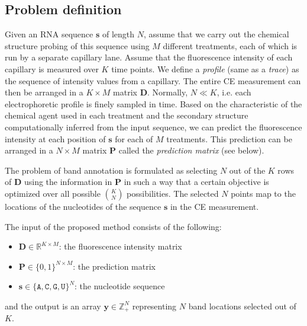 \newcommand{\bA}{{\mathbf{D}}}
\newcommand{\bB}{{\mathbf{B}}}
\newcommand{\bC}{{\mathbf{P}}}
\newcommand{\bP}{{\mathbf{P}}}
\newcommand{\bF}{{\mathbf{F}}}
\newcommand{\bL}{{\mathbf{L}}}
\newcommand{\ba}{{\mathbf{d}}}
\newcommand{\bp}{{\mathbf{p}}}
\newcommand{\bs}{{\mathbf{s}}}
\newcommand{\by}{{\mathbf{y}}}

\subsection{Problem definition}
Given an RNA sequence $\bs$ of length $N$, assume that we carry out the chemical structure probing of this sequence using $M$ different treatments, each of which is run by a separate capillary lane. Assume that the fluorescence intensity of each capillary is measured over $K$ time points. We define a \emph{profile} (same as a \emph{trace}) as the sequence of intensity values from a capillary. The entire CE measurement can then be arranged in a $K \times M$ matrix $\bA$. Normally, $N \ll K$, i.e. each electrophoretic profile is finely sampled in time. Based on the characteristic of the chemical agent used in each treatment and the secondary structure computationally inferred from the input sequence, we can predict the fluorescence intensity at each position of $\bs$ for each of $M$ treatments. This prediction can be arranged in a $N \times M$ matrix $\bC$ called the \emph{prediction matrix} (see below).

The problem of band annotation is formulated as selecting $N$ out of the $K$ rows of $\bA$ using the information in $\bC$ in such a way that a certain objective is optimized over all possible ${K \choose N}$ possibilities. The selected $N$ points map to the locations of the nucleotides of the sequence $\bs$ in the CE measurement.

The input of the proposed method consists of the following:
\begin{itemize}
\item $\bA \in \mathbb{R}^{K \times M}$: the fluorescence intensity matrix
\item $\bC \in \{0,1\}^{N \times M}$: the prediction matrix
\item $\bs \in \{\mathtt{A}, \mathtt{C}, \mathtt{G}, \mathtt{U}\}^N$: the nucleotide sequence
\end{itemize}
and the output is an array $\by \in \mathbb{Z}_+^N$ representing $N$ band locations selected out of $K$.




